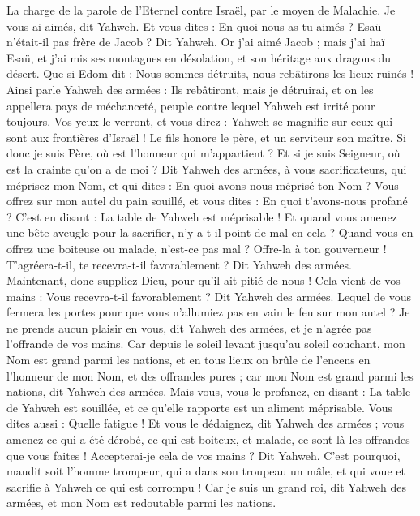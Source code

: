 \begin{multicols}{2}
\VerseOne{}La charge de la parole de l'Eternel contre Israël, par le moyen de Malachie.
Je vous ai aimés, dit Yahweh. Et vous dites : En quoi nous as-tu aimés ? Esaü n'était-il pas frère de Jacob ? Dit Yahweh. Or j'ai aimé Jacob ;
mais j'ai haï Esaü, et j'ai mis ses montagnes en désolation, et son héritage aux dragons du désert.
Que si Edom dit : Nous sommes détruits, nous rebâtirons les lieux ruinés ! Ainsi parle Yahweh des armées : Ils rebâtiront, mais je détruirai, et on les appellera pays de méchanceté, peuple contre lequel Yahweh est irrité pour toujours.
Vos yeux le verront, et vous direz : Yahweh se magnifie sur ceux qui sont aux frontières d'Israël !
Le fils honore le père, et un serviteur son maître. Si donc je suis Père, où est l'honneur qui m'appartient ? Et si je suis Seigneur, où est la crainte qu'on a de moi ? Dit Yahweh des armées, à vous sacrificateurs, qui méprisez mon Nom, et qui dites : En quoi avons-nous méprisé ton Nom ?
Vous offrez sur mon autel du pain souillé, et vous dites : En quoi t'avons-nous profané ? C'est en disant : La table de Yahweh est méprisable !
Et quand vous amenez une bête aveugle pour la sacrifier, n'y a-t-il point de mal en cela ? Quand vous en offrez une boiteuse ou malade, n'est-ce pas mal ? Offre-la à ton gouverneur ! T'agréera-t-il, te recevra-t-il favorablement ? Dit Yahweh des armées.
Maintenant, donc suppliez Dieu, pour qu'il ait pitié de nous ! Cela vient de vos mains : Vous recevra-t-il favorablement ? Dit Yahweh des armées.
Lequel de vous fermera les portes pour que vous n'allumiez pas en vain le feu sur mon autel ? Je ne prends aucun plaisir en vous, dit Yahweh des armées, et je n'agrée pas l'offrande de vos mains.
Car depuis le soleil levant jusqu'au soleil couchant, mon Nom est grand parmi les nations, et en tous lieux on brûle de l'encens en l'honneur de mon Nom, et des offrandes pures ; car mon Nom est grand parmi les nations, dit Yahweh des armées.
Mais vous, vous le profanez, en disant : La table de Yahweh est souillée, et ce qu'elle rapporte est un aliment méprisable.
Vous dites aussi : Quelle fatigue ! Et vous le dédaignez, dit Yahweh des armées ; vous amenez ce qui a été dérobé, ce qui est boiteux, et malade, ce sont là les offrandes que vous faites ! Accepterai-je cela de vos mains ? Dit Yahweh.
C'est pourquoi, maudit soit l'homme trompeur, qui a dans son troupeau un mâle, et qui voue et sacrifie à Yahweh ce qui est corrompu ! Car je suis un grand roi, dit Yahweh des armées, et mon Nom est redoutable parmi les nations.

\end{multicols}
